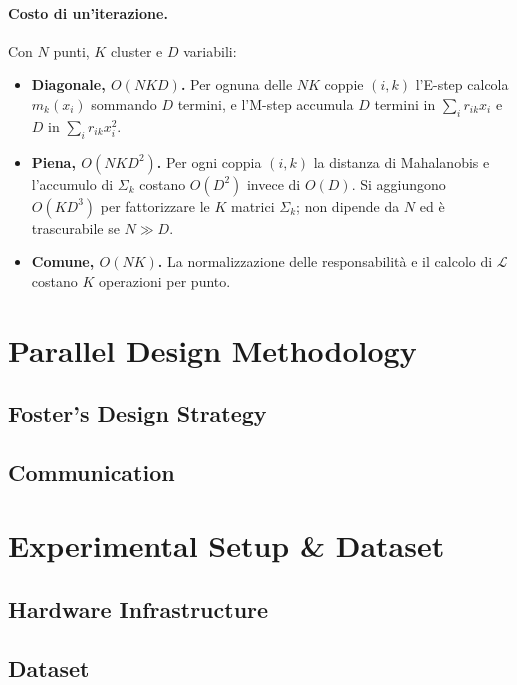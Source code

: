 \documentclass[conference]{IEEEtran}
\begin{document}
\paragraph{Costo di un'iterazione.} Con $N$ punti, $K$ cluster e $D$ variabili:
\begin{itemize}
\item \textbf{Diagonale, $O(NKD)$.} Per ognuna delle $NK$ coppie $(i,k)$ l'E-step calcola $m_k(x_i)$ sommando $D$ termini, e l'M-step accumula $D$ termini in $\sum_i r_{ik}x_i$ e $D$ in $\sum_i r_{ik}x_i^2$.
\item \textbf{Piena, $O(NKD^2)$.} Per ogni coppia $(i,k)$ la distanza di Mahalanobis e l'accumulo di $\Sigma_k$ costano $O(D^2)$ invece di $O(D)$. Si aggiungono $O(KD^3)$ per fattorizzare le $K$ matrici $\Sigma_k$; non dipende da $N$ ed è trascurabile se $N\gg D$.
\item \textbf{Comune, $O(NK)$.} La normalizzazione delle responsabilità e il calcolo di $\mathcal{L}$ costano $K$ operazioni per punto.
\end{itemize}


\section{Parallel Design Methodology}\label{sec:design}
\subsection{Foster's Design Strategy}
\subsection{Communication}

\section{Experimental Setup \& Dataset}
\subsection{Hardware Infrastructure}
\subsection{Dataset}
\end{document}
